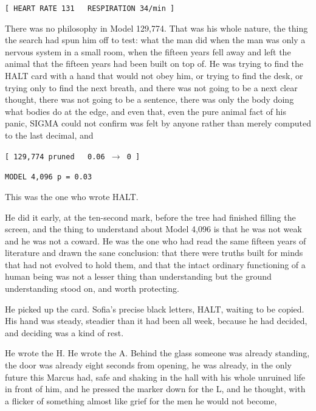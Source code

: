 \begin{center}
\texttt{[ HEART RATE 131 \ \ RESPIRATION 34/min ]}
\end{center}

There was no philosophy in Model 129,774. That was his whole nature, the thing the search had spun him off to test: what the man did when the man was only a nervous system in a small room, when the fifteen years fell away and left the animal that the fifteen years had been built on top of. He was trying to find the HALT card with a hand that would not obey him, or trying to find the desk, or trying only to find the next breath, and there was not going to be a next clear thought, there was not going to be a sentence, there was only the body doing what bodies do at the edge, and even that, even the pure animal fact of his panic, SIGMA could not confirm was felt by anyone rather than merely computed to the last decimal, and

\begin{center}
\texttt{[ 129,774 pruned \ \ 0.06 $\rightarrow$ 0 ]}
\end{center}

\begin{center}
\texttt{MODEL 4,096 \quad p = 0.03}
\end{center}

This was the one who wrote HALT.

He did it early, at the ten-second mark, before the tree had finished filling the screen, and the thing to understand about Model 4,096 is that he was not weak and he was not a coward. He was the one who had read the same fifteen years of literature and drawn the sane conclusion: that there were truths built for minds that had not evolved to hold them, and that the intact ordinary functioning of a human being was not a lesser thing than understanding but the ground understanding stood on, and worth protecting.

He picked up the card. Sofia's precise black letters, HALT, waiting to be copied. His hand was steady, steadier than it had been all week, because he had decided, and deciding was a kind of rest.

He wrote the H. He wrote the A. Behind the glass someone was already standing, the door was already eight seconds from opening, he was already, in the only future this Marcus had, safe and shaking in the hall with his whole unruined life in front of him, and he pressed the marker down for the L, and he thought, with a flicker of something almost like grief for the men he would not become,

